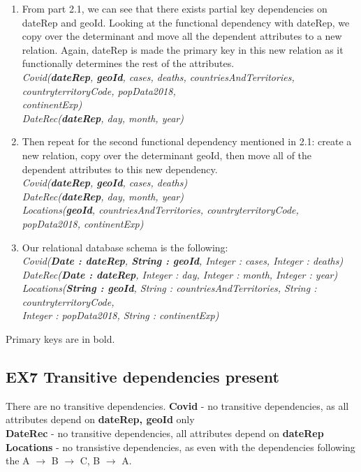 \documentclass{report}
\begin{document}
\begin{enumerate}
\item From part 2.1, we can see that there exists partial key dependencies on dateRep and geoId. Looking at the functional dependency with dateRep, we copy over the determinant and move all the dependent attributes to a new relation. Again, dateRep is made the primary key in this new relation as it functionally determines the rest of the attributes. \\
    
\noindent
\textit{Covid(\textbf{dateRep}, \textbf{geoId}, cases, deaths, countriesAndTerritories, countryterritoryCode, popData2018, \\ \indent \indent continentExp)} \\
\textit{DateRec(\textbf{dateRep}, day, month, year)}\\

\item Then repeat for the second functional dependency mentioned in 2.1: create a new relation, copy over the determinant geoId, then move all of the dependent attributes to this new dependency. \\

\noindent
\textit{Covid(\textbf{dateRep}, \textbf{geoId}, cases, deaths)} \\
\textit{DateRec(\textbf{dateRep}, day, month, year)}\\
\textit{Locations(\textbf{geoId}, countriesAndTerritories, countryterritoryCode, popData2018, continentExp)} \\

\item Our relational database schema is the following: \vspace{2mm}\\
\noindent
\textit{Covid(\textbf{Date : dateRep}, \textbf{String : geoId}, Integer : cases, Integer : deaths)} \\
\textit{DateRec(\textbf{Date : dateRep}, Integer : day, Integer : month, Integer : year)}\\
\textit{Locations(\textbf{String : geoId}, String : countriesAndTerritories, String : countryterritoryCode, \\ Integer : popData2018, String : continentExp)} \\
\end{enumerate}

\noindent Primary keys are in bold.
\vspace{2mm} 

\subsection*{EX7 Transitive dependencies present }
There are no transitive dependencies.
\textbf{Covid} - no transitive dependencies, as all attributes depend on \textbf{dateRep, geoId} only \\
\textbf{DateRec} - no transitive dependencies, all attributes depend on \textbf{dateRep} \\
\textbf{Locations} - no transistive dependencies, as even with the dependencies following the A $\rightarrow$ B $\rightarrow$ C, B $\rightarrow$ A.
\end{document}

